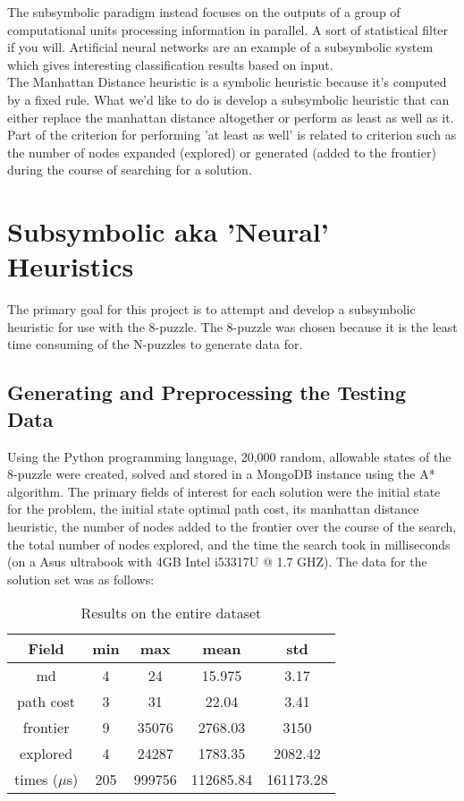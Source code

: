 \documentclass[a4, 12pt]{article}
\begin{document}
The subsymbolic paradigm instead focuses on the outputs of a group of computational units processing information in parallel. A sort of statistical filter if you will. Artificial neural networks are an example of a subsymbolic system which gives interesting classification results based on input. \\

The Manhattan Distance heuristic is a symbolic heuristic because it's computed by a fixed rule. What we'd like to do is develop a subsymbolic heuristic that can either replace the manhattan distance altogether or perform as least as well as it. Part of the criterion for performing 'at least as well' is related to criterion such as the number of nodes expanded (explored) or generated (added to the frontier) during the course of searching for a solution. \\

\section{Subsymbolic aka 'Neural' Heuristics}
The primary goal for this project is to attempt and develop a subsymbolic heuristic for use with the 8-puzzle. The 8-puzzle was chosen because it is the least time consuming of the N-puzzles to generate data for.  \\

\subsection{Generating and Preprocessing the Testing Data}
Using the Python programming language, 20,000 random, allowable states of the 8-puzzle were created, solved and stored in a MongoDB instance using the A* algorithm. The primary fields of interest for each solution were the initial state for the problem, the initial state optimal path cost, its manhattan distance heuristic, the number of nodes added to the frontier over the course of the search, the total number of nodes explored, and the time the search took in milliseconds (on a Asus ultrabook with 4GB Intel i53317U @ 1.7 GHZ). The data for the solution set was as follows: \\

\begin{table}[H]
\caption{Results on the entire dataset}
\centering
\begin{tabular}{c c c c c }
Field & min & max & mean & std \\
\hline
md & 4 & 24 & 15.975 & 3.17 \\ 

path cost& 3  & 31 & 22.04 & 3.41\\

frontier & 9 & 35076 & 2768.03 & 3150\\

explored & 4 & 24287 & 1783.35 & 2082.42\\

times ($\mu$s) & 205 & 999756 & 112685.84 & 161173.28 \\
\end{tabular}
\end{table}
\end{document}
